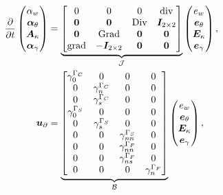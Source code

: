 \begin{equation}\label{eq:phsysMin}
\begin{aligned}
\displaystyle
\diffp{}{t}
\begin{pmatrix}
\alpha_w \\
\bm\alpha_\theta \\
\bm{A}_\kappa \\
\bm\alpha_{\gamma} \\
\end{pmatrix} &= 
\underbrace{\begin{bmatrix}
0  & 0  & 0  & \div \\
\bm{0} & \bm{0} &  \Div & \bm{I}_{2 \times 2}\\
\bm{0}  & \Grad  & \bm{0}  & \bm{0}\\
\grad & -\bm{I}_{2 \times 2} &  \bm{0} & \bm{0} \\
\end{bmatrix}}_{\mathcal{J}}
\begin{pmatrix}
e_w \\
\bm{e}_{\theta} \\
\bm{E}_{\kappa} \\
\bm{e}_{\gamma} \\
\end{pmatrix}, \vspace{3pt}\\
\bm{u}_\partial &= \underbrace{
\begin{bmatrix}
\gamma_{0}^{\Gamma_C} & {0} & {0} & {0} \\
{0} & \gamma_n^{\Gamma_C} &  {0} & {0} \\
{0} & \gamma_s^{\Gamma_C} &  {0} & {0} \\
\gamma_{0}^{\Gamma_S} & {0} & {0} & {0} \\
{0} & \gamma_s^{\Gamma_S} & {0} & {0} \\
{0} &  {0} & \gamma_{nn}^{\Gamma_S} & {0} \\
{0} &  {0} & \gamma_{nn}^{\Gamma_F} & {0} \\
{0} &  {0} & \gamma_{ns}^{\Gamma_F} & {0} \\
{0} &  {0} & {0} & \gamma_{n}^{\Gamma_F} \\
\end{bmatrix}}_{\mathcal{B}} \begin{pmatrix}
e_w \\
\bm{e}_{\theta} \\
\bm{E}_{\kappa} \\
\bm{e}_{\gamma} \\
\end{pmatrix}, \vspace{3pt}\\

\end{aligned}
\end{equation}
